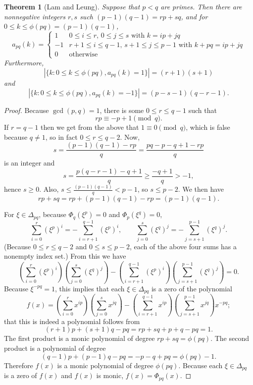\documentclass{article}
\newtheorem{theorem}{Theorem}
\theoremstyle{definition}
\begin{document}
\begin{theorem}[Lam and Leung]
Suppose that $p<q$ are primes. Then there are  nonnegative integers $r,s$ such
$(p-1)(q-1)=rp+sq$, and for
$0 \leq k \leq \phi(pq)=(p-1)(q-1)$,
\[
a_{pq}(k) = \begin{cases}
1&\textrm{$0 \leq i \leq r$, $0 \leq j \leq s$ with $k=ip+jq$}\\
-1&\textrm{$r+1 \leq i \leq q-1$, $s+1 \leq j \leq p-1$ with $k+pq=ip+jq$}\\
0&\textrm{otherwise}
\end{cases}
\]
Furthermore,
\[
|\{k: 0 \leq k \leq \phi(pq), a_{pq}(k)=1\}| = (r+1)(s+1)
\]
and
\[
|\{k: 0 \leq k \leq \phi(pq), a_{pq}(k)=-1\}| = (p-s-1)(q-r-1).
\]
\end{theorem}
\begin{proof}
Because $\gcd(p,q)=1$, there is some $0 \leq r \leq q-1$ such that
\[
rp   \equiv -p+1  \pmod{q}.
\]
If $r=q-1$ then we get
from the above that $1 \equiv 0 \pmod{q}$, which is false because $q \neq 1$, so in fact
$0 \leq r \leq q-2$. 
Now,
\[
s=\frac{(p-1)(q-1)-rp}{q}=\frac{pq-p-q+1-rp}{q} 
\]
is an integer and
\[
s = \frac{p(q-r-1)-q+1}{q} \geq \frac{-q+1}{q}>-1,
\]
hence $s \geq 0$. Also,
$s \leq \frac{(p-1)(q-1)}{q} < p-1$, so $s \leq p-2$. We then have
\[
rp+sq=rp+(p-1)(q-1)-rp = (p-1)(q-1).
\]
 
For $\xi \in \Delta_{pq}$, because $\Phi_q(\xi^p)=0$ and $\Phi_p(\xi^q)=0$,
\[
\sum_{i=0}^r (\xi^p)^i = - \sum_{i=r+1}^{q-1} (\xi^p)^i,
\qquad
\sum_{j=0}^s (\xi^q)^j = - \sum_{j=s+1}^{p-1} (\xi^q)^j.
\]
(Because $0 \leq r \leq q-2$ and $0 \leq s \leq p-2$, each of the above four sums has a nonempty index
set.)
From this we have
\[
\left( \sum_{i=0}^r (\xi^p)^i \right) \left(\sum_{j=0}^s (\xi^q)^j \right)
-\left(\sum_{i=r+1}^{q-1} (\xi^p)^i\right) \left( \sum_{j=s+1}^{p-1} (\xi^q)^j\right)=0.
\]
Because $\xi^{-pq}=1$, 
this implies that each $\xi \in \Delta_{pq}$ is a zero of the polynomial
\[
f(x)  = \left( \sum_{i=0}^r x^{ip} \right) \left(\sum_{j=0}^s x^{jq} \right)
-\left(\sum_{i=r+1}^{q-1} x^{ip} \right) \left( \sum_{j=s+1}^{p-1} x^{jq} \right) x^{-pq};
\]
that this is indeed a polynomial follows from
\[
(r+1)p+(s+1)q-pq=rp+sq+p+q-pq=1.
\]
The first product is a monic polynomial of degree $rp+sq=\phi(pq)$. The second product is a polynomial
of degree
\[
(q-1)p+(p-1)q-pq=-p-q+pq=\phi(pq)-1.
\]
Therefore $f(x)$ is a monic polynomial of degree
$\phi(pq)$. Because each $\xi \in \Delta_{pq}$ is a zero of $f(x)$ and $f(x)$ is monic,
$f(x)=\Phi_{pq}(x)$. 
\end{proof}
\end{document}
